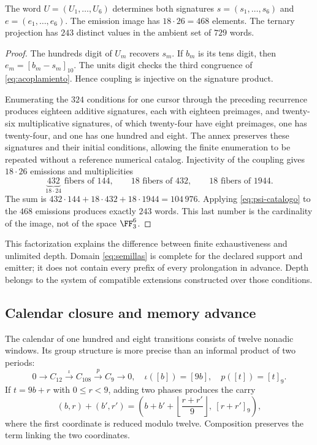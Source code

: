\begin{proposition}
The word \(U=(U_1,\ldots,U_6)\) determines both signatures \(s=(s_1,\ldots,s_6)\) and \(e=(e_1,\ldots,e_6)\). The emission image has \(18\cdot26=468\) elements. The ternary projection has \(243\) distinct values in the ambient set of \(729\) words.
\end{proposition}
\begin{proof}
The hundreds digit of \(U_m\) recovers \(s_m\). If \(b_m\) is its tens digit, then \(e_m=[b_m-s_m]_{10}\). The units digit checks the third congruence of \eqref{eq:acoplamiento}. Hence coupling is injective on the signature product.

Enumerating the \(324\) conditions for one cursor through the preceding recurrence produces eighteen additive signatures, each with eighteen preimages, and twenty-six multiplicative signatures, of which twenty-four have eight preimages, one has twenty-four, and one has one hundred and eight. The annex preserves these signatures and their initial conditions, allowing the finite enumeration to be repeated without a reference numerical catalog. Injectivity of the coupling gives \(18\cdot26\) emissions and multiplicities
\[
 \underbrace{432}_{18\cdot24}\text{ fibers of }144,
 \qquad18\text{ fibers of }432,
 \qquad18\text{ fibers of }1944.
\]
The sum is \(432\cdot144+18\cdot432+18\cdot1944=104\,976\). Applying \eqref{eq:psi-catalogo} to the \(468\) emissions produces exactly \(243\) words. This last number is the cardinality of the image, not of the space \(\FF_3^6\).
\end{proof}

This factorization explains the difference between finite exhaustiveness and unlimited depth. Domain \eqref{eq:semillas} is complete for the declared support and emitter; it does not contain every prefix of every prolongation in advance. Depth belongs to the system of compatible extensions constructed over those conditions.



\subsection{Calendar closure and memory advance}

The calendar of one hundred and eight transitions consists of twelve nonadic windows. Its group structure is more precise than an informal product of two periods:
\begin{equation}
 0\longrightarrow C_{12}\xrightarrow{\iota}C_{108}
 \xrightarrow{p}C_9\longrightarrow0,
 \quad\iota([b])=[9b],\quad p([t])=[t]_9.
 \label{eq:extension108}
\end{equation}
If \(t=9b+r\) with \(0\le r<9\), adding two phases produces the carry
\[
 (b,r)+(b',r')=
 \left(b+b'+\left\lfloor\frac{r+r'}9\right\rfloor,\ [r+r']_9\right),
\]
where the first coordinate is reduced modulo twelve. Composition preserves the term linking the two coordinates.

